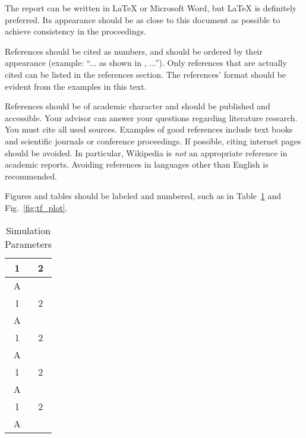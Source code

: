 \documentclass[journal, a4paper]{IEEEtran}
\begin{document}
    The report can be written in \LaTeX{} or Microsoft Word, but \LaTeX{} is definitely preferred.
    Its appearance should be as close to this document as possible to achieve consistency in the proceedings.

    References should be cited as numbers, and should be ordered by their appearance (example: ``... as shown in \cite{HOP96}, ...'').
    Only references that are actually cited can be listed in the references section.
    The references' format should be evident from the examples in this text.

    References should be of academic character and should be published and accessible.
    Your advisor can answer your questions regarding literature research.
    You must cite all used sources.
    Examples of good references include text books and scientific journals or conference proceedings.
    If possible, citing internet pages should be avoided. In particular, Wikipedia is \emph{not} an appropriate reference in academic reports.
    Avoiding references in languages other than English is recommended.

    Figures and tables should be labeled and numbered, such as in Table~\ref{tab:simParameters} and Fig.~\ref{fig:tf_plot}.

    \begin{table}[!hbt]
        \begin{center}
        \caption{Simulation Parameters}
        \label{tab:simParameters}
        \begin{tabular}{|c|c|}
            \hline
            1 & 2\\
            \hline
            A & \\
            \hline
            1 & 2\\
            \hline
            A & \\
            \hline
            1 & 2\\
            \hline
            A & \\
            \hline
            1 & 2\\
            \hline
            A & \\
            \hline
            1 & 2\\
            \hline
            A & \\
        \end{tabular}
        \end{center}
    \end{table}
\end{document}
